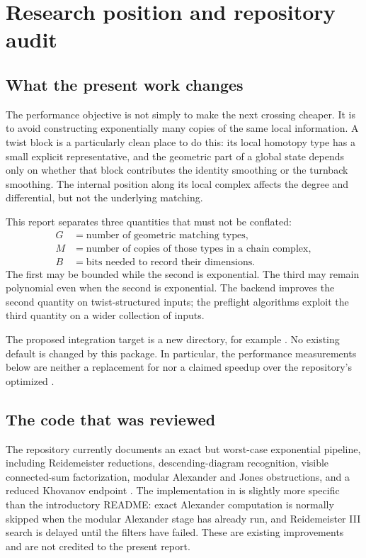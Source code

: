 \documentclass[11pt,letterpaper]{article}
\theoremstyle{definition}
\newcommand{\code}[1]{\texttt{\detokenize{#1}}}
\begin{document}
\setcounter{tocdepth}{1}
\tableofcontents
\newpage

\section{Research position and repository audit}
\subsection{What the present work changes}
The performance objective is not simply to make the next crossing cheaper.
It is to avoid constructing exponentially many copies of the same local information. A twist block is a particularly clean place to do this: its local homotopy type has a small explicit representative, and the geometric part of a global state depends only on whether that block contributes the identity smoothing or the turnback smoothing. The internal position along its local complex affects the degree and differential, but not the underlying matching.

This report separates three quantities that must not be conflated:
\begin{equation}\label{eq:threecounts}
\begin{aligned}
 G&=\text{number of geometric matching types},\\
 M&=\text{number of copies of those types in a chain complex},\\
 B&=\text{bits needed to record their dimensions}.
\end{aligned}
\end{equation}
The first may be bounded while the second is exponential. The third may remain polynomial even when the second is exponential. The backend improves the second quantity on twist-structured inputs; the preflight algorithms exploit the third quantity on a wider collection of inputs.

The proposed integration target is a new directory, for example
.
No existing default is changed by this package. In particular, the performance measurements below are neither a replacement for nor a claimed speedup over the repository's optimized \code{fastunknot.scan}.

\subsection{The code that was reviewed}
The repository currently documents an exact but worst-case exponential pipeline, including Reidemeister reductions, descending-diagram recognition, visible connected-sum factorization, modular Alexander and Jones obstructions, and a reduced Khovanov endpoint \cite{repo}. The implementation in \code{recognize.py} is slightly more specific than the introductory README: exact Alexander computation is normally skipped when the modular Alexander stage has already run, and Reidemeister III search is delayed until the filters have failed. These are existing improvements and are not credited to the present report.
\end{document}
